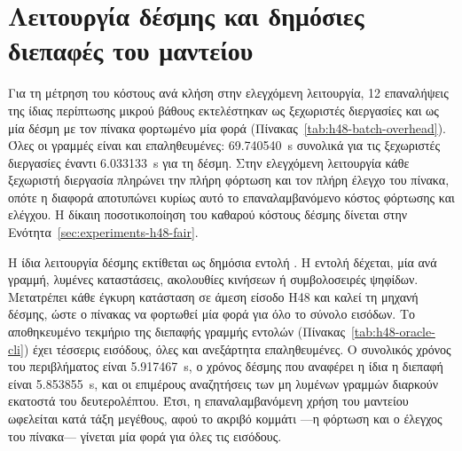 \section{Λειτουργία δέσμης και δημόσιες διεπαφές του μαντείου}
\label{sec:experiments-h48-interfaces}

Για τη μέτρηση του κόστους ανά κλήση στην ελεγχόμενη λειτουργία, 12 επαναλήψεις της ίδιας περίπτωσης μικρού βάθους εκτελέστηκαν ως ξεχωριστές διεργασίες και ως μία δέσμη με τον πίνακα φορτωμένο μία φορά (Πίνακας~\ref{tab:h48-batch-overhead}). Όλες οι γραμμές είναι  και επαληθευμένες: 69.740540~s συνολικά για τις ξεχωριστές διεργασίες έναντι 6.033133~s για τη δέσμη. Στην ελεγχόμενη λειτουργία κάθε ξεχωριστή διεργασία πληρώνει την πλήρη φόρτωση και τον πλήρη έλεγχο του πίνακα, οπότε η διαφορά αποτυπώνει κυρίως αυτό το επαναλαμβανόμενο κόστος φόρτωσης και ελέγχου. Η δίκαιη ποσοτικοποίηση του καθαρού κόστους δέσμης δίνεται στην Ενότητα~\ref{sec:experiments-h48-fair}.

\begin{table}[htbp]\centering

\caption[Κόστος δέσμης σε ελεγχόμενη λειτουργία χωρίς κοινή προθέρμανση]{Κόστος δέσμης σε ελεγχόμενη λειτουργία, χωρίς κοινή προθέρμανση: 12 επαναλήψεις ως ξεχωριστές διεργασίες έναντι μίας δέσμης· η διαφορά οφείλεται κυρίως στην επαναλαμβανόμενη φόρτωση και στον επαναλαμβανόμενο έλεγχο του πίνακα και υπερεκτιμά το καθαρό όφελος της δέσμης· η δίκαιη μέτρηση δίνεται στον Πίνακα~\ref{tab:h48-batch-fair}. Πηγή: .}
\label{tab:h48-batch-overhead}
\end{table}

Η ίδια λειτουργία δέσμης εκτίθεται ως δημόσια εντολή . Η εντολή δέχεται, μία ανά γραμμή, λυμένες καταστάσεις, ακολουθίες κινήσεων ή συμβολοσειρές ψηφίδων. Μετατρέπει κάθε έγκυρη κατάσταση σε άμεση είσοδο H48 και καλεί τη μηχανή δέσμης, ώστε ο πίνακας  να φορτωθεί μία φορά για όλο το σύνολο εισόδων. Το αποθηκευμένο τεκμήριο της διεπαφής γραμμής εντολών (Πίνακας~\ref{tab:h48-oracle-cli}) έχει τέσσερις εισόδους, όλες  και ανεξάρτητα επαληθευμένες. Ο συνολικός χρόνος του περιβλήματος είναι 5.917467~s, ο χρόνος δέσμης που αναφέρει η ίδια η διεπαφή είναι 5.853855~s, και οι επιμέρους αναζητήσεις των μη λυμένων γραμμών διαρκούν εκατοστά του δευτερολέπτου. Έτσι, η επαναλαμβανόμενη χρήση του μαντείου ωφελείται κατά τάξη μεγέθους, αφού το ακριβό κομμάτι —η φόρτωση και ο έλεγχος του πίνακα— γίνεται μία φορά για όλες τις εισόδους.

